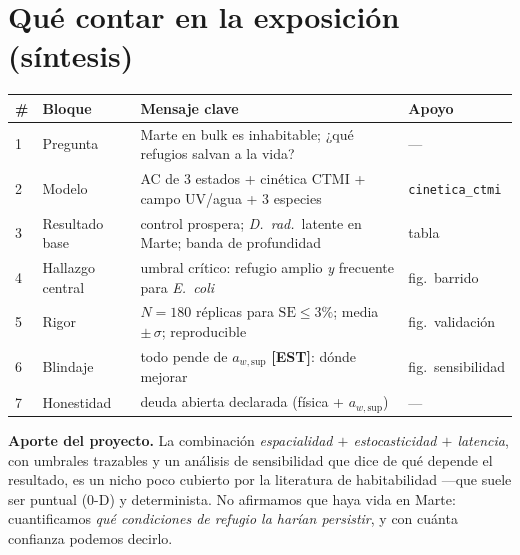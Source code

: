 \documentclass[11pt]{article}
\newcommand{\est}[1]{\textcolor{procest}{\textbf{#1}}}
\begin{document}
\section*{Qué contar en la exposición (síntesis)}

\begin{center}\small
\begin{tabular}{@{}llll@{}}
\toprule
\# & Bloque & Mensaje clave & Apoyo \\
\midrule
1 & Pregunta & Marte en bulk es inhabitable; ¿qué refugios salvan a la vida? & --- \\
2 & Modelo & AC de 3 estados + cinética CTMI + campo UV/agua + 3 especies & \texttt{cinetica\_ctmi} \\
3 & Resultado base & control prospera; \emph{D.\ rad.}\ latente en Marte; banda de profundidad & tabla \\
4 & Hallazgo central & umbral crítico: refugio amplio \emph{y} frecuente para \emph{E.\ coli} & fig.\ barrido \\
5 & Rigor & $N=180$ réplicas para $\mathrm{SE}\le 3\%$; media $\pm\,\sigma$; reproducible & fig.\ validación \\
6 & Blindaje & todo pende de $a_{w,\text{sup}}$ \est{[EST]}: dónde mejorar & fig.\ sensibilidad \\
7 & Honestidad & deuda abierta declarada (física + $a_{w,\text{sup}}$) & --- \\
\bottomrule
\end{tabular}
\end{center}

\noindent\textbf{Aporte del proyecto.} La combinación \emph{espacialidad $+$
estocasticidad $+$ latencia}, con umbrales trazables y un análisis de sensibilidad
que dice de qué depende el resultado, es un nicho poco cubierto por la literatura de
habitabilidad —que suele ser puntual (0-D) y determinista. No afirmamos que haya
vida en Marte: cuantificamos \emph{qué condiciones de refugio la harían persistir},
y con cuánta confianza podemos decirlo.
\end{document}

